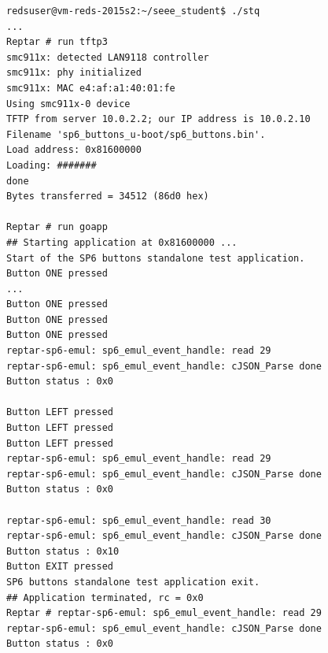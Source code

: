 \begin{lstlisting}
redsuser@vm-reds-2015s2:~/seee_student$ ./stq
...
Reptar # run tftp3
smc911x: detected LAN9118 controller
smc911x: phy initialized
smc911x: MAC e4:af:a1:40:01:fe
Using smc911x-0 device
TFTP from server 10.0.2.2; our IP address is 10.0.2.10
Filename 'sp6_buttons_u-boot/sp6_buttons.bin'.
Load address: 0x81600000
Loading: #######
done
Bytes transferred = 34512 (86d0 hex)

Reptar # run goapp
## Starting application at 0x81600000 ...
Start of the SP6 buttons standalone test application.
Button ONE pressed
...
Button ONE pressed
Button ONE pressed
Button ONE pressed
reptar-sp6-emul: sp6_emul_event_handle: read 29 
reptar-sp6-emul: sp6_emul_event_handle: cJSON_Parse done 
Button status : 0x0

Button LEFT pressed
Button LEFT pressed
Button LEFT pressed
reptar-sp6-emul: sp6_emul_event_handle: read 29 
reptar-sp6-emul: sp6_emul_event_handle: cJSON_Parse done 
Button status : 0x0

reptar-sp6-emul: sp6_emul_event_handle: read 30 
reptar-sp6-emul: sp6_emul_event_handle: cJSON_Parse done 
Button status : 0x10
Button EXIT pressed
SP6 buttons standalone test application exit.
## Application terminated, rc = 0x0
Reptar # reptar-sp6-emul: sp6_emul_event_handle: read 29 
reptar-sp6-emul: sp6_emul_event_handle: cJSON_Parse done 
Button status : 0x0
\end{lstlisting}
